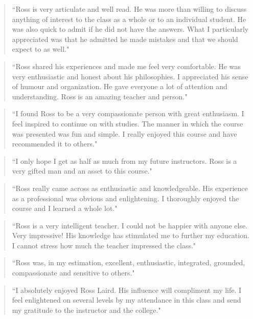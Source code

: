 \documentclass[10pt,DIV09,letterpaper,oneside,headsepline]{scrreprt}
\begin{document}
\begin{quote} ``Ross is very articulate and well read. He was more than willing to discuss anything of interest to the class as a whole or to an individual student. He was also quick to admit if he did not have the answers. What I particularly appreciated was that he admitted he made mistakes and that we should expect to as well." \end{quote}

\begin{quote}
``Ross shared his experiences and made me feel very comfortable. He was very enthusiastic and honest about his philosophies. I appreciated his sense of humour and organization. He gave everyone a lot of attention and understanding. Ross is an amazing teacher and person."
\end{quote}

\begin{quote} ``I found Ross to be a very compassionate person with great enthusiasm. I feel inspired to continue on with studies. The manner in which the course was presented was fun and simple. I really enjoyed this course and have recommended it to others." \end{quote}

\begin{quote} ``I only hope I get as half as much from my future instructors. Ross is a very gifted man and an asset to this course." \end{quote}

\begin{quote} ``Ross really came across as enthusiastic and knowledgeable. His experience as a professional was obvious and enlightening. I thoroughly enjoyed the course and I learned a whole lot." \end{quote}

\begin{quote} ``Ross is a very intelligent teacher. I could not be happier with anyone else. Very impressive! His knowledge has stimulated me to further my education. I cannot stress how much the teacher impressed the class." \end{quote}

\begin{quote} ``Ross was, in my estimation, excellent, enthusiastic, integrated, grounded, compassionate and sensitive to others." \end{quote}

\begin{quote}
``I absolutely enjoyed Ross Laird. His influence will compliment my life. I feel enlightened on several levels by my attendance in this class and send my gratitude to the instructor and the college."
\end{quote}
\end{document}
